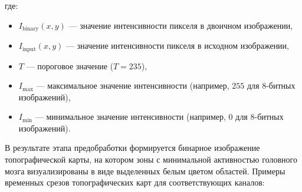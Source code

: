 \begin{enumerate}
\begin{enumerate}
                где:
                \begin{itemize}
                    \item \( I_{\text{binary}}(x, y) \) — значение интенсивности пикселя в двоичном изображении,
                    \item \( I_{\text{input}}(x, y) \) — значение интенсивности пикселя в исходном изображении,
                    \item \( T \) — пороговое значение (\(T = 235\)),
                    \item \( I_{\text{max}} \) — максимальное значение интенсивности (например, \(255\) для 8-битных изображений),
                    \item \( I_{\text{min}} \) — минимальное значение интенсивности (например, \(0\) для 8-битных изображений).
                \end{itemize}
        \end{enumerate}
    \end{enumerate}
    В результате этапа предобработки формируется бинарное изображение топографической карты, на котором зоны с минимальной активностью головного мозга визуализированы в виде выделенных белым цветом областей.
Примеры временных срезов топографических карт для соответствующих каналов: \newline
